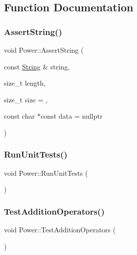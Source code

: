 \subsection{Function Documentation}
\mbox{\label{namespace_power_a94cb0120c19b1c711fcf5959130efc67}} 
\subsubsection{\texorpdfstring{Assert\+String()}{AssertString()}}
{\footnotesize\ttfamily void Power\+::\+Assert\+String (\begin{DoxyParamCaption}\item[{const \hyperlink{class_power_1_1_string}{String} \&}]{string,  }\item[{size\+\_\+t}]{length,  }\item[{size\+\_\+t}]{size = {},  }\item[{const char $\ast$const}]{data = {\ttfamily nullptr} }\end{DoxyParamCaption})}

\mbox{\label{namespace_power_a98ecb039bc50b27644cdee95dff097d3}} 
\subsubsection{\texorpdfstring{Run\+Unit\+Tests()}{RunUnitTests()}}
{\footnotesize\ttfamily void Power\+::\+Run\+Unit\+Tests (\begin{DoxyParamCaption}{ }\end{DoxyParamCaption})}

\mbox{\label{namespace_power_af5fd85b391b910757cd55c237cfac27a}} 
\subsubsection{\texorpdfstring{Test\+Addition\+Operators()}{TestAdditionOperators()}}
{\footnotesize\ttfamily void Power\+::\+Test\+Addition\+Operators (\begin{DoxyParamCaption}{ }\end{DoxyParamCaption})}

